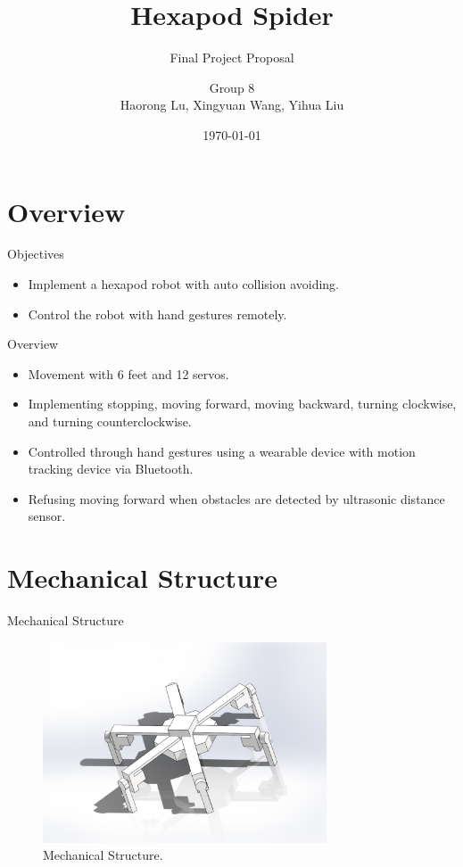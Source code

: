\documentclass[12pt]{beamer}
\begin{document}
\title{Hexapod Spider}
\subtitle{Final Project Proposal}
\author[Group 8]{Group 8\\[\baselineskip]Haorong Lu, Xingyuan Wang, Yihua Liu}
\date{\today}
\begin{frame}
    \titlepage
\end{frame}
\section{Overview}
\begin{frame}{Objectives}
    \begin{itemize}
        \item Implement a hexapod robot with auto collision avoiding.
        \item Control the robot with hand gestures remotely.
    \end{itemize}
\end{frame}

\begin{frame}{Overview}
    \begin{itemize}
        \item Movement with 6 feet and 12 servos.
        \item Implementing stopping, moving forward, moving backward, turning clockwise, and turning counterclockwise.
        \item Controlled through hand gestures using a wearable device with motion tracking device via Bluetooth.
        \item Refusing moving forward when obstacles are detected by ultrasonic distance sensor.
    \end{itemize}
\end{frame}

\section{Mechanical Structure}
\begin{frame}{Mechanical Structure}
    \begin{figure}[H]
        \centering
        \includegraphics[width=0.75\textwidth]{Mechanical_Structure_2D.pdf}
        \caption{Mechanical Structure.}
    \end{figure}
\end{frame}
\end{document}
